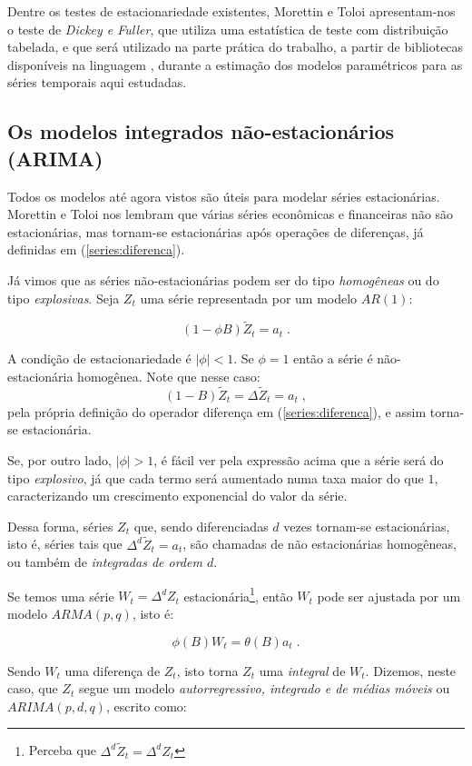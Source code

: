Dentre os testes de estacionariedade existentes, Morettin e Toloi \citep{morettin} apresentam-nos o teste de \emph{Dickey e Fuller}, que utiliza uma estatística de teste com distribuição tabelada, e que será utilizado na parte prática do trabalho, a partir de bibliotecas disponíveis na linguagem , durante a estimação dos modelos paramétricos para as séries temporais aqui estudadas.


\subsection{Os modelos integrados não-estacionários (ARIMA)}

Todos os modelos até agora vistos são úteis para modelar séries estacionárias. Morettin e Toloi \citep{morettin} nos lembram que várias séries econômicas e financeiras não são estacionárias, mas tornam-se estacionárias após operações de diferenças, já definidas em (\ref{series:diferenca}). 

Já vimos que as séries não-estacionárias podem ser do tipo \emph{homogêneas} ou do tipo \emph{explosivas}. Seja $Z_t$ uma série representada por um modelo $AR(1)$:

\[
(1 - \phi B)\tilde{Z}_t = a_t\;.
\]

A condição de estacionariedade é $|\phi| < 1$. Se $\phi = 1$ então a série é não-estacionária homogênea. Note que nesse caso: 
\[ (1 - B)\tilde{Z}_t = \Delta \tilde{Z}_t = a_t\;, \]
pela própria definição do operador diferença em (\ref{series:diferenca}), e assim torna-se estacionária. 

Se, por outro lado, $|\phi| > 1$, é fácil ver pela expressão acima que a série será do tipo \emph{explosivo}, já que cada termo será aumentado numa taxa maior do que $1$, caracterizando um crescimento exponencial do valor da série.

Dessa forma, séries $Z_t$ que, sendo diferenciadas $d$ vezes tornam-se estacionárias, isto é, séries tais que $\Delta^d \tilde{Z}_t = a_t$, são chamadas de não estacionárias homogêneas, ou também de \emph{integradas de ordem $d$}.

Se temos uma série $W_t = \Delta^d Z_t$ estacionária\footnote{Perceba que $\Delta^d \tilde{Z}_t = \Delta^d Z_t$}, então $W_t$ pode ser ajustada por um modelo $ARMA(p, q)$, isto é:

\[
\phi(B) W_t = \theta(B) a_t\;.
\]

Sendo $W_t$ uma diferença de $Z_t$, isto torna $Z_t$ uma \emph{integral} de $W_t$. Dizemos, neste caso, 
que $Z_t$ segue um modelo \emph{autorregressivo, integrado e de médias móveis} ou $ARIMA(p, d, q)$, escrito como:


